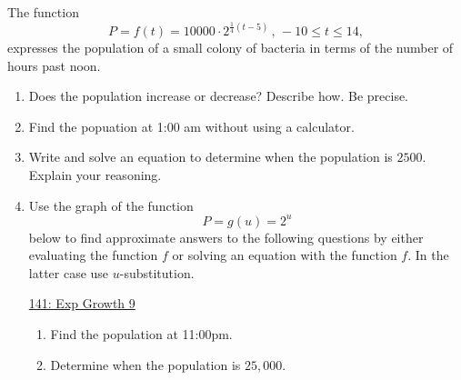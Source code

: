 \documentclass{ximera}
\begin{document}
\begin{question} \label{Q435tt5444}
The function
\[
     P = f(t) = 10000 \cdot 2^{\frac{1}{4}(t-5)} \, , \, -10\leq t \leq 14,
\]
expresses the population of a small colony of bacteria in terms of the number of hours past noon.
\begin{enumerate}
\item Does the population increase or decrease? Describe how. Be precise.

\item Find the popuation at 1:00 am without using a calculator.

\item Write and solve an equation to determine when the population is $2500$. Explain your reasoning.

\item Use the graph of the function 
\[
     P = g(u) = 2^u
\]
below to find approximate answers to the following questions by either evaluating the function $f$ or solving an equation with the function $f$. In the latter case use $u$-substitution.

\begin{onlineOnly}
    \begin{center}
\end{center}
\end{onlineOnly}

\href{https://www.desmos.com/calculator/kd4eyb0ubi}{141: Exp Growth 9}

\begin{enumerate}
\item Find the population at 11:00pm.

\item Determine when the population is $25,000$.
\end{enumerate}
\end{enumerate}

\end{question}
\end{document}
